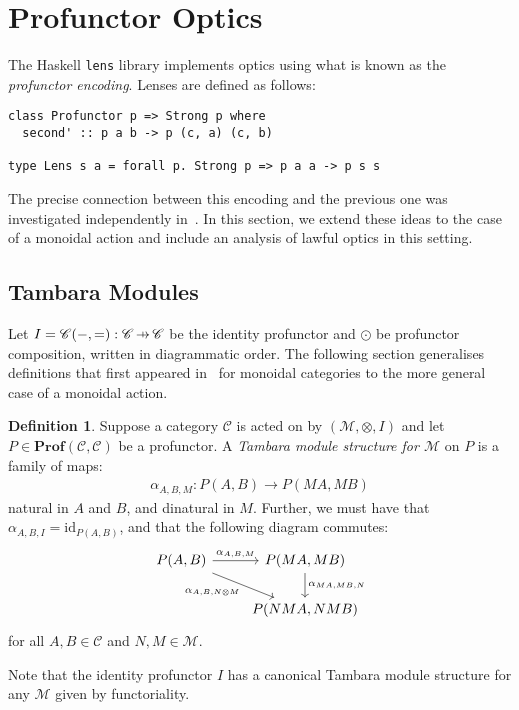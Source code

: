 \documentclass[11pt,a4paper]{article}
\theoremstyle{plain}
\theoremstyle{definition}
\newtheorem{definition}[theorem]{Definition}
\newcommand{\C}{\mathscr{C}}
\newcommand{\M}{\mathscr{M}}
\newcommand{\lenslib}{\texttt{lens}}
\newcommand{\Prof}{\mathbf{Prof}}
\newcommand{\id}{\mathrm{id}}
\newcommand{\hto}{\ensuremath{\,\mathaccent\shortmid\rightarrow\,}}
\begin{document}
\section{Profunctor Optics}
The Haskell \lenslib{} library implements optics using what is known as the \emph{profunctor encoding}. Lenses are defined as follows:

\begin{verbatim}
class Profunctor p => Strong p where
  second' :: p a b -> p (c, a) (c, b)

type Lens s a = forall p. Strong p => p a a -> p s s
\end{verbatim}

The precise connection between this encoding and the previous one was investigated independently in~\cite{ProfunctorOpticsPost}. In this section, we extend these ideas to the case of a monoidal action and include an analysis of lawful optics in this setting.

\subsection{Tambara Modules}
Let $I = \C(-,{=}) : \C \hto \C$ be the identity profunctor and $\odot$ be profunctor composition, written in diagrammatic order. The following section generalises definitions that first appeared in~\cite[Section 3]{Doubles} for monoidal categories to the more general case of a monoidal action.

\begin{definition}
  Suppose a category $\C$ is acted on by $(\M, \otimes, I)$ and let $P \in \Prof(\C, \C)$ be a profunctor. A \emph{Tambara module structure for $\M$} on $P$ is a family of maps:
  \begin{align*}
    \alpha_{A,B,M} : P(A,B) \to P(MA, MB)
  \end{align*}
  natural in $A$ and $B$, and dinatural in $M$. Further, we must have that $\alpha_{A,B,I} = \id_{P(A,B)}$, and that the following diagram commutes:
  \[
    \begin{tikzcd}
      P(A,B) \ar[r, "\alpha_{A,B,M}"] \ar[dr, "\alpha_{A, B, N \otimes M}" below left] & P(MA, MB) \ar[d, "\alpha_{MA, MB, N}" right] \\
      & P(NMA, NMB)
    \end{tikzcd}
  \]
  for all $A, B \in \C$ and $N, M \in \M$.
\end{definition}

Note that the identity profunctor $I$ has a canonical Tambara module structure for any $\M$ given by functoriality.
\end{document}
